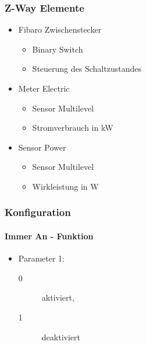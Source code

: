 \subsubsection{Z-Way Elemente}
\begin{itemize}
	\item Fibaro Zwischenstecker
	\begin{itemize}
		\item Binary Switch
		\item Steuerung des Schaltzustandes
	\end{itemize}
	\item Meter Electric
	\begin{itemize}
		\item Sensor Multilevel
		\item Stromverbrauch in kW
	\end{itemize}
	\item Sensor Power
	\begin{itemize}
		\item Sensor Multilevel
		\item Wirkleistung in W
	\end{itemize}
\end{itemize}

\subsubsection{Konfiguration}

\paragraph{Immer An - Funktion}
\begin{itemize}
	\item Parameter 1:
	\begin{description}
		\item [0] aktiviert,
		\item [1] deaktiviert
	\end{description}
\end{itemize}

